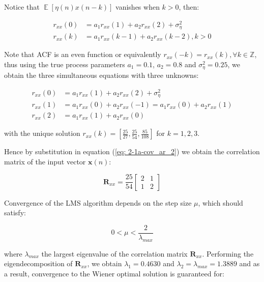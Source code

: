 \documentclass[12pt]{article}
\DeclareMathOperator*{\E}{\mathbb{E}}
\def\setInteger{{\mathbb{Z}}}
\begin{document}
			Notice that $\E [\eta(n) x(n-k)]$ vanishes when $k > 0$, then:
			
			\begin{align}
			r_{xx}(0)   &= a_{1} r_{xx}(1) + a_{2} r_{xx}(2) + \sigma_{\eta}^{2} \\
			r_{xx}(k)   &= a_{1} r_{xx}(k-1) + a_{2} r_{xx}(k-2), k > 0
			\label{eq: 2-1a-acf_ar_2}
			\end{align}
			
			Note that ACF is an even function or equivalently $r_{xx}(-k) = r_{xx}(k), \forall k \in \setInteger$, thus using the true process parameters $a_{1} = 0.1$, $a_{2} = 0.8$
			and $\sigma_{\eta}^{2} = 0.25$, we obtain the three simultaneous equations with three unknowns:
			
			\begin{align}
			r_{xx}(0)   &= a_{1} r_{xx}(1) + a_{2} r_{xx}(2) + \sigma_{\eta}^{2} \\
			r_{xx}(1)   &= a_{1} r_{xx}(0) + a_{2} r_{xx}(-1) = a_{1} r_{xx}(0) + a_{2} r_{xx}(1) \\
			r_{xx}(2)   &= a_{1} r_{xx}(1) + a_{2} r_{xx}(0)
			\end{align}
			
			with the unique solution $r_{xx}(k) = [\frac{25}{27}, \frac{25}{54}, \frac{85}{108}]$ for $k=1, 2, 3$.
			
			Hence by substitution in equation (\ref{eq: 2-1a-cov_ar_2}) we obtain the  correlation matrix of the input vector $\mathbf{x}(n)$:
			
			\begin{equation}
			\mathbf{R}_{xx} = 
			\frac{25}{54}
			\begin{bmatrix}
			2 & 1 \\
			1 & 2
			\end{bmatrix}
			\label{eq: 2-1a-cov_ar_2_result}
			\end{equation}
			
			Convergence of the LMS algorithm depends on the step size $\mu$, which should satisfy:
			
			\begin{equation}
			0 < \mu < \frac{2}{\lambda_{max}}
			\label{eq: 2-1a-cond:mu_max}
			\end{equation}
			
			where $\lambda_{max}$ the largest eigenvalue of the correlation matrix $\mathbf{R}_{xx}$. Performing the eigendecomposition of $\mathbf{R}_{xx}$, we obtain
			$\lambda_{1} = 0.4630$ and $\lambda_{2} = \lambda_{max} = 1.3889$ and as a result, convergence to the Wiener optimal solution is guaranteed for:
			
\end{document}
